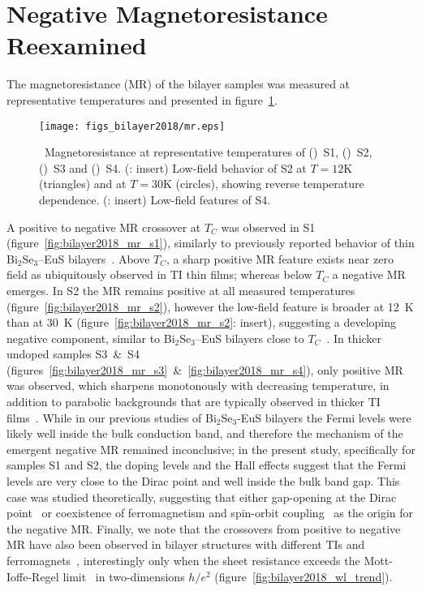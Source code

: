 \FloatBarrier%
\section{Negative Magnetoresistance Reexamined}
The magnetoresistance (MR) of the bilayer samples was measured at representative temperatures and presented in figure~\ref{fig:bilayer2018_mr}. %
%
\begin{figure}[ht]%
    \centering%
    \texttt{[image: figs\_bilayer2018/mr.eps]}%
    \subfloat{\label{fig:bilayer2018_mr_s1}}%
    \subfloat{\label{fig:bilayer2018_mr_s2}}%
    \subfloat{\label{fig:bilayer2018_mr_s3}}%
    \subfloat{\label{fig:bilayer2018_mr_s4}}%
    \caption[Magnetoresistance of (Bi$_{x}$Sb$_{1-x}$)$_2$Te$_3$--EuS bilayers]{\label{fig:bilayer2018_mr}~Magnetoresistance at representative temperatures of (\protect{})~S1, (\protect{})~S2, (\protect{})~S3 and (\protect{})~S4. (\protect{}: insert) Low-field behavior of S2 at $T = 12\mathrm{K}$ (triangles) and at $T = 30\mathrm{K}$ (circles), showing reverse temperature dependence. (\protect{}: insert) Low-field features of S4.}%
\end{figure}%
%
A positive to negative MR crossover at $T_C$ was observed in S1 (figure~\ref{fig:bilayer2018_mr_s1}), similarly to previously reported behavior of thin Bi$_2$Se$_3$--EuS bilayers~\cite{bilayer2014}. Above $T_C$, a sharp positive MR feature exists near zero field as ubiquitously observed in TI thin films; whereas below $T_C$ a negative MR emerges. In S2 the MR remains positive at all measured temperatures (figure~\ref{fig:bilayer2018_mr_s2}), however the low-field feature is broader at 12~K than at 30~K (figure~\ref{fig:bilayer2018_mr_s2}: insert), suggesting a developing negative component, similar to Bi$_2$Se$_3$--EuS bilayers close to $T_C$~\cite{bilayer2014}. In thicker undoped samples S3~\&~S4 (figures~\ref{fig:bilayer2018_mr_s3}~\&~\ref{fig:bilayer2018_mr_s4}), only positive MR was observed, which sharpens monotonously with decreasing temperature, in addition to parabolic backgrounds that are typically observed in thicker TI films~\cite{TI_WAL_thickness}. While in our previous studies of Bi$_2$Se$_3$-EuS bilayers the Fermi levels were likely well inside the bulk conduction band, and therefore the mechanism of the emergent negative MR remained inconclusive; in the present study, specifically for samples S1 and S2, the doping levels and the Hall effects suggest that the Fermi levels are very close to the Dirac point and well inside the bulk band gap. This case was studied theoretically, suggesting that either gap-opening at the Dirac point~\cite{WL_Glazman, WL_WAL_competition} or coexistence of ferromagnetism and spin-orbit coupling~\cite{WL_ferromagnetism} as the origin for the negative MR. Finally, we note that the crossovers from positive to negative MR have also been observed in bilayer structures with different TIs and ferromagnets~\cite{Samarth2017, Tian2016}, interestingly only when the sheet resistance exceeds the Mott-Ioffe-Regel limit~\cite{mott_book, Fradkin1986b} in two-dimensions $h/e^2$ (figure~\ref{fig:bilayer2018_wl_trend}). %
